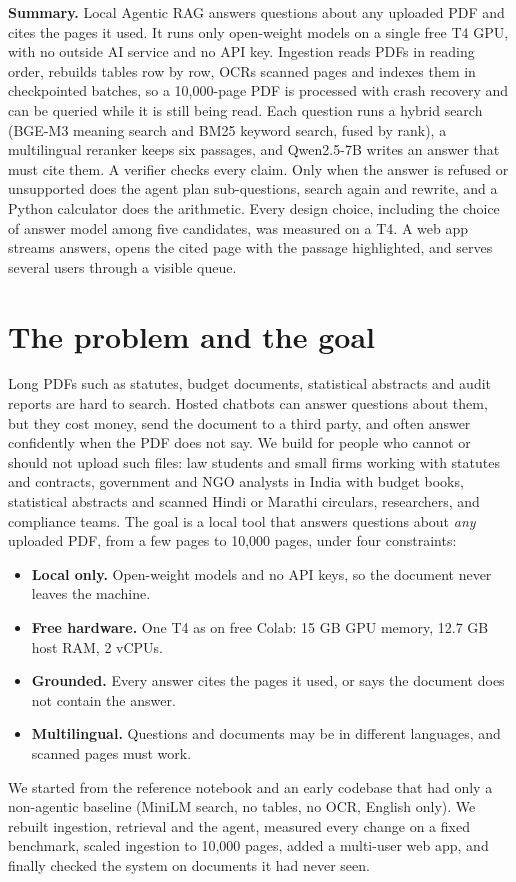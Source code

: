 \documentclass[10pt,a4paper]{article}
\begin{document}
\vspace{4pt}
\begin{panel}
\fontsize{9.2}{11.6}\selectfont
\textbf{Summary.} Local Agentic RAG answers questions about any uploaded PDF and cites the pages it used.
It runs only open-weight models on a single free T4 GPU, with no outside AI service and no API key. Ingestion reads PDFs in
reading order, rebuilds tables row by row, OCRs scanned pages and indexes them in checkpointed batches, so a 10,000-page PDF is processed with crash recovery and can be
queried while it is still being read. Each question runs a hybrid search (BGE-M3 meaning search and BM25 keyword search, fused by rank), a multilingual reranker keeps six passages,
and Qwen2.5-7B writes an answer that must cite them. A verifier checks every claim. Only when the answer is refused or unsupported does the agent plan sub-questions, search again and rewrite,
and a Python calculator does the arithmetic. Every design choice, including the choice of answer model among five candidates, was measured on a T4. A web app streams answers, opens the
cited page with the passage highlighted, and serves several users through a visible queue.
\end{panel}

\section{The problem and the goal}
Long PDFs such as statutes, budget documents, statistical abstracts and audit reports are hard to search.
Hosted chatbots can answer questions about them, but they cost money, send the document to a third party,
and often answer confidently when the PDF does not say. We build for people who cannot or should not upload such files:
law students and small firms working with statutes and contracts, government and NGO analysts in India with
budget books, statistical abstracts and scanned Hindi or Marathi circulars, researchers, and compliance teams.
The goal is a local tool that answers questions about \emph{any} uploaded PDF, from a few pages to 10,000 pages,
under four constraints:
\begin{itemize}
  \item \textbf{Local only.} Open-weight models and no API keys, so the document never leaves the machine.
  \item \textbf{Free hardware.} One T4 as on free Colab: 15 GB GPU memory, 12.7 GB host RAM, 2 vCPUs.
  \item \textbf{Grounded.} Every answer cites the pages it used, or says the document does not contain the answer.
  \item \textbf{Multilingual.} Questions and documents may be in different languages, and scanned pages must work.
\end{itemize}
We started from the reference notebook and an early codebase that had only a non-agentic baseline
(MiniLM search, no tables, no OCR, English only). We rebuilt ingestion, retrieval and the agent, measured
every change on a fixed benchmark, scaled ingestion to 10,000 pages, added a multi-user web app, and finally checked
the system on documents it had never seen.
\end{document}
